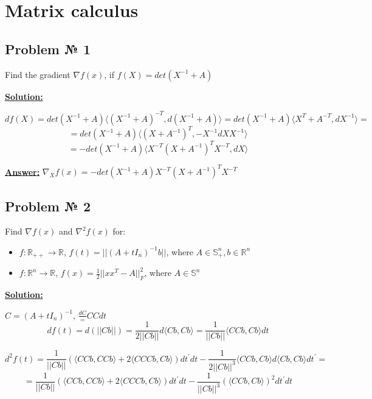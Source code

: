 \section{Matrix calculus}

\subsection{Problem № 1} Find the gradient $\nabla f(x)$, if $f(X) = det \left( X^{-1} + A \right)$

\underline{\textbf{Solution:}}

\begin{equation*}
    df(X) = det \left(X^{-1} + A \right) \langle (X^{-1} + A)^{-T}, d(X^{-1} + A) \rangle = det \left(X^{-1} + A \right) \langle X^{T} + A^{-T}, dX^{-1} \rangle =
\end{equation*}
\begin{equation*}
    = det \left(X^{-1} + A \right) \langle (X + A^{-1})^T, -X^{-1}dX X^{-1} \rangle 
\end{equation*}
\begin{equation*}
    = -det \left(X^{-1} + A \right) \langle X^{-T}(X + A^{-1})^TX^{-T}, dX \rangle
\end{equation*}

\underline{\textbf{Answer:}} $\nabla_X f(x) = -det \left(X^{-1} + A \right) X^{-T}(X + A^{-1})^TX^{-T}$

\subsection{Problem № 2} 
Find $\nabla f(x)$ and $\nabla^2 f(x)$ for:
\begin{itemize}
    \item $f: \mathbb{R}_{++} \xrightarrow{} \mathbb{R}$, $f(t) = ||(A+tI_n)^{-1}b||$, where $A \in \mathbb{S}_{+}^n, b \in \mathbb{R}^n$
    \item $f: \mathbb{R}^{n} \xrightarrow{} \mathbb{R}$, $f(x) = \frac{1}{2}||xx^T-A||_F^2$, where $A \in \mathbb{S}^n$
\end{itemize}
\underline{\textbf{Solution:}}

$C = (A+tI_n)^{-1}$, $\frac{dC} = CCdt$
\begin{equation*}
    df(t) = d(||Cb||) = \frac{1}{2||Cb||} d\langle Cb, Cb \rangle = \frac{1}{||Cb||} \langle CCb, Cb \rangle dt
\end{equation*}

\begin{equation*}
    d^2f(t) = \frac{1}{||Cb||}\left(\langle CCb, CCb\rangle + 2\langle CCCb, Cb\rangle\right)dt^'dt - \frac{1}{2||Cb||^{3}} \langle CCb, Cb \rangle d \langle Cb, Cb \rangle dt^' = 
\end{equation*}
\begin{equation*}
     = \frac{1}{||Cb||}\left(\langle CCb, CCb\rangle + 2\langle CCCb, Cb\rangle \right)dt^'dt - \frac{1}{||Cb||^{3}} (\langle CCb, Cb \rangle)^2dt^'dt
\end{equation*}

